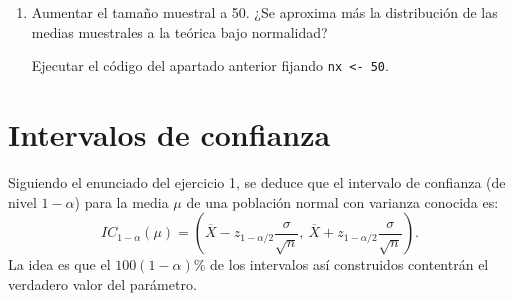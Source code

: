 \documentclass[]{book}
\theoremstyle{definition}
\theoremstyle{definition}
\theoremstyle{definition}
\theoremstyle{remark}
\let\BeginKnitrBlock\begin \let\EndKnitrBlock\end
\begin{document}
 \vspace{0.5cm}

\begin{enumerate}
\def\labelenumi{\alph{enumi})}
\setcounter{enumi}{1}
\item
  Aumentar el tamaño muestral a 50. ¿Se aproxima más la distribución de
  las medias muestrales a la teórica bajo normalidad?

  Ejecutar el código del apartado anterior fijando
  \texttt{nx\ \textless{}-\ 50}.
\end{enumerate}

\section{Intervalos de confianza}\label{intervalos-de-confianza}

\BeginKnitrBlock{exercise}
\protect\hypertarget{exr:unnamed-chunk-15}{}{\label{exr:unnamed-chunk-15} }
\EndKnitrBlock{exercise}

Siguiendo el enunciado del ejercicio 1, se deduce que el intervalo de
confianza (de nivel \(1-\alpha\)) para la media \(\mu\) de una población
normal con varianza conocida es: \[IC_{1-\alpha}\left(  \mu\right)  = 
\left(  \overline{X}-z_{1-\alpha/2}\dfrac{\sigma}{\sqrt{n}},\ \overline{X} 
+ z_{1-\alpha/2}\dfrac{\sigma}{\sqrt{n}} \right).\] La idea es que el
\(100(1-\alpha)\%\) de los intervalos así construidos contentrán el
verdadero valor del parámetro.
\end{document}
